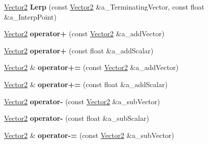 \begin{DoxyCompactItemize}
\item 
\hypertarget{class_ai_math_1_1_vector2_ab6d14def017ec3774d0cff05594de16f}{\hyperlink{class_ai_math_1_1_vector2}{Vector2} {\bfseries Lerp} (const \hyperlink{class_ai_math_1_1_vector2}{Vector2} \&a\+\_\+\+Terminating\+Vector, const float \&a\+\_\+\+Interp\+Point)}\label{class_ai_math_1_1_vector2_ab6d14def017ec3774d0cff05594de16f}

\item 
\hypertarget{class_ai_math_1_1_vector2_a374c62a6d858776be69c6bcf4a38e314}{\hyperlink{class_ai_math_1_1_vector2}{Vector2} {\bfseries operator+} (const \hyperlink{class_ai_math_1_1_vector2}{Vector2} \&a\+\_\+add\+Vector)}\label{class_ai_math_1_1_vector2_a374c62a6d858776be69c6bcf4a38e314}

\item 
\hypertarget{class_ai_math_1_1_vector2_afc6f20d12e72f915284fcb5e260d05a4}{\hyperlink{class_ai_math_1_1_vector2}{Vector2} {\bfseries operator+} (const float \&a\+\_\+add\+Scalar)}\label{class_ai_math_1_1_vector2_afc6f20d12e72f915284fcb5e260d05a4}

\item 
\hypertarget{class_ai_math_1_1_vector2_ab9608dd622c8bb2fc74429f9406ca84b}{\hyperlink{class_ai_math_1_1_vector2}{Vector2} \& {\bfseries operator+=} (const \hyperlink{class_ai_math_1_1_vector2}{Vector2} \&a\+\_\+add\+Vector)}\label{class_ai_math_1_1_vector2_ab9608dd622c8bb2fc74429f9406ca84b}

\item 
\hypertarget{class_ai_math_1_1_vector2_a50425ad38b7f5e35ce3e3af68b9d2dc2}{\hyperlink{class_ai_math_1_1_vector2}{Vector2} \& {\bfseries operator+=} (const float \&a\+\_\+add\+Scalar)}\label{class_ai_math_1_1_vector2_a50425ad38b7f5e35ce3e3af68b9d2dc2}

\item 
\hypertarget{class_ai_math_1_1_vector2_acbdde8a74ca17cbf57015b52f1ce7730}{\hyperlink{class_ai_math_1_1_vector2}{Vector2} {\bfseries operator-\/} (const \hyperlink{class_ai_math_1_1_vector2}{Vector2} \&a\+\_\+sub\+Vector)}\label{class_ai_math_1_1_vector2_acbdde8a74ca17cbf57015b52f1ce7730}

\item 
\hypertarget{class_ai_math_1_1_vector2_a5f2825e1953858d241b7977af77a76f7}{\hyperlink{class_ai_math_1_1_vector2}{Vector2} {\bfseries operator-\/} (const float \&a\+\_\+sub\+Scalar)}\label{class_ai_math_1_1_vector2_a5f2825e1953858d241b7977af77a76f7}

\item 
\hypertarget{class_ai_math_1_1_vector2_ae0aa4af38b8d63ccbe913f04b8b3d59b}{\hyperlink{class_ai_math_1_1_vector2}{Vector2} \& {\bfseries operator-\/=} (const \hyperlink{class_ai_math_1_1_vector2}{Vector2} \&a\+\_\+sub\+Vector)}\label{class_ai_math_1_1_vector2_ae0aa4af38b8d63ccbe913f04b8b3d59b}


\end{DoxyCompactItemize}
